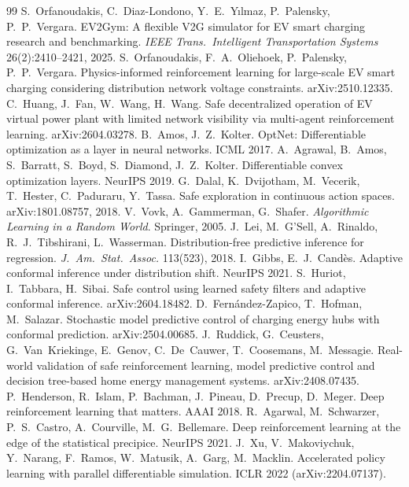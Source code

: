 \documentclass[10pt]{article}
\begin{document}
\begin{thebibliography}{99}\small
{} S.~Orfanoudakis, C.~Diaz-Londono, Y.~E.~Y{\i}lmaz, P.~Palensky, P.~P.~Vergara. EV2Gym: A flexible V2G simulator for EV smart charging research and benchmarking. \emph{IEEE Trans.\ Intelligent Transportation Systems} 26(2):2410--2421, 2025.
 S.~Orfanoudakis, F.~A.~Oliehoek, P.~Palensky, P.~P.~Vergara. Physics-informed reinforcement learning for large-scale EV smart charging considering distribution network voltage constraints. arXiv:2510.12335.
 C.~Huang, J.~Fan, W.~Wang, H.~Wang. Safe decentralized operation of EV virtual power plant with limited network visibility via multi-agent reinforcement learning. arXiv:2604.03278.
 B.~Amos, J.~Z.~Kolter. OptNet: Differentiable optimization as a layer in neural networks. ICML 2017.
 A.~Agrawal, B.~Amos, S.~Barratt, S.~Boyd, S.~Diamond, J.~Z.~Kolter. Differentiable convex optimization layers. NeurIPS 2019.
 G.~Dalal, K.~Dvijotham, M.~Vecerik, T.~Hester, C.~Paduraru, Y.~Tassa. Safe exploration in continuous action spaces. arXiv:1801.08757, 2018.
 V.~Vovk, A.~Gammerman, G.~Shafer. \emph{Algorithmic Learning in a Random World}. Springer, 2005.
 J.~Lei, M.~G'Sell, A.~Rinaldo, R.~J.~Tibshirani, L.~Wasserman. Distribution-free predictive inference for regression. \emph{J.\ Am.\ Stat.\ Assoc.} 113(523), 2018.
 I.~Gibbs, E.~J.~Cand\`es. Adaptive conformal inference under distribution shift. NeurIPS 2021.
 S.~Huriot, I.~Tabbara, H.~Sibai. Safe control using learned safety filters and adaptive conformal inference. arXiv:2604.18482.
 D.~Fern\'andez-Zapico, T.~Hofman, M.~Salazar. Stochastic model predictive control of charging energy hubs with conformal prediction. arXiv:2504.00685.
 J.~Ruddick, G.~Ceusters, G.~Van~Kriekinge, E.~Genov, C.~De~Cauwer, T.~Coosemans, M.~Messagie. Real-world validation of safe reinforcement learning, model predictive control and decision tree-based home energy management systems. arXiv:2408.07435.
 P.~Henderson, R.~Islam, P.~Bachman, J.~Pineau, D.~Precup, D.~Meger. Deep reinforcement learning that matters. AAAI 2018.
 R.~Agarwal, M.~Schwarzer, P.~S.~Castro, A.~Courville, M.~G.~Bellemare. Deep reinforcement learning at the edge of the statistical precipice. NeurIPS 2021.
 J.~Xu, V.~Makoviychuk, Y.~Narang, F.~Ramos, W.~Matusik, A.~Garg, M.~Macklin. Accelerated policy learning with parallel differentiable simulation. ICLR 2022 (arXiv:2204.07137).

\end{thebibliography}
\end{document}
